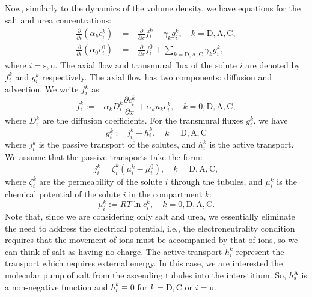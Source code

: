 \documentclass{article}
\begin{document}
Now, similarly to the dynamics of the volume density, we have equations for the salt and urea concentrations:
\begin{align}\label{eq:solute_dynamics}
    \frac{\partial}{\partial t}\left( \alpha_k c_i^k \right)&=-\frac{\partial}{\partial x} f_i^k - \gamma_kg_i^k,\quad k=\mathrm{D},\mathrm{A},\mathrm{C},\\
    \frac{\partial}{\partial t}\left( \alpha_0 c_i^0 \right)&=-\frac{\partial}{\partial x} f_i^0 + \sum_{k=\mathrm{D},\mathrm{A},\mathrm{C}} \gamma_k g_i^k,
\end{align}
    where $i=\mathrm{s},\mathrm{u}$.
The axial flow and transmural flux of the solute $i$ are denoted by $f_i^k$ and $g_i^k$ respectively.
The axial flow has two components: diffusion and advection.
We write $f_i^k$ as
\begin{equation}
    f_i^k := -\alpha_k D_i^k\frac{\partial c_i^k}{\partial x}+\alpha_ku_kc_i^k,\quad k=0,\mathrm{D},\mathrm{A},\mathrm{C},
\end{equation}
    where $D_i^k$ are the diffusion coefficients.
For the transmural fluxes $g_i^k$, we have
\begin{equation}
    g_i^k := j_i^k+h_i^k,\quad k=\mathrm{D},\mathrm{A},\mathrm{C}
\end{equation}
    where $j_i^k$ is the passive transport of the solutes, and $h_i^k$ is the active transport.
We assume that the passive transports take the form:
\begin{equation}
    j_i^k = \zeta_i^k\left( \mu_i^k - \mu_i^0 \right),\quad k=\mathrm{D},\mathrm{A},\mathrm{C},
\end{equation}
    where $\zeta_i^k$ are the permeability of the solute $i$ through the tubules, and $\mu_i^k$ is the chemical potential of the solute $i$ in the compartment $k$:
\begin{equation}
    \mu_i^k:= RT\ln c_i^k,\quad k=0,\mathrm{D},\mathrm{A},\mathrm{C}.
\end{equation}
Note that, since we are considering only salt and urea, we essentially eliminate the need to address the electrical potential, i.e., the electroneutrality condition requires that the movement of  ions must be accompanied by that of  ions, so we can think of salt as having no charge.
The active transport $h_i^k$ represent the transport which requires external energy.
In this case, we are interested the molecular pump of salt from the ascending tubules into the interstitium.
So, $h_\mathrm{s}^\mathrm{A}$ is a non-negative function and $h_i^k\equiv 0$ for $k=\mathrm{D},\mathrm{C}$ or $i=\mathrm{u}$.
\end{document}
